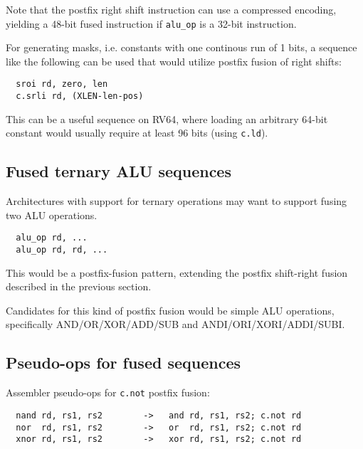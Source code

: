 Note that the postfix right shift instruction can use a compressed encoding,
yielding a 48-bit fused instruction if {\tt alu\_op} is a 32-bit instruction.

For generating masks, i.e. constants with one continous run of 1 bits, a sequence
like the following can be used that would utilize postfix fusion of right shifts:

\begin{minipage}{\linewidth}
\begin{verbatim}
  sroi rd, zero, len
  c.srli rd, (XLEN-len-pos)
\end{verbatim}
\end{minipage}

This can be a useful sequence on RV64, where loading an arbitrary 64-bit constant would usually
require at least 96 bits (using \texttt{c.ld}).


\subsection{Fused ternary ALU sequences}

Architectures with support for ternary operations may want to support fusing two ALU operations.

\begin{minipage}{\linewidth}
\begin{verbatim}
  alu_op rd, ...
  alu_op rd, rd, ...
\end{verbatim}
\end{minipage}

This would be a postfix-fusion pattern, extending the postfix shift-right
fusion described in the previous section.

Candidates for this kind of postfix fusion would be simple ALU operations, specifically
AND/OR/XOR/ADD/SUB and ANDI/ORI/XORI/ADDI/SUBI.


\subsection{Pseudo-ops for fused sequences}

Assembler pseudo-ops for {\tt c.not} postfix fusion:

\begin{minipage}{\linewidth}
\begin{verbatim}
  nand rd, rs1, rs2        ->   and rd, rs1, rs2; c.not rd
  nor  rd, rs1, rs2        ->   or  rd, rs1, rs2; c.not rd
  xnor rd, rs1, rs2        ->   xor rd, rs1, rs2; c.not rd
\end{verbatim}
\end{minipage}


